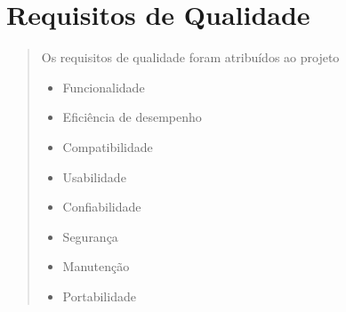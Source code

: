 \section[Requisitos de Qualidade]{Requisitos de Qualidade}
\begin{quote} Os requisitos de qualidade foram atribuídos ao projeto
	\begin{itemize}
        \item Funcionalidade
		\item Eficiência de desempenho
		\item Compatibilidade
		\item Usabilidade
		\item Confiabilidade
		\item Segurança
		\item Manutenção
		\item Portabilidade
    \end{itemize}
\end{quote}
